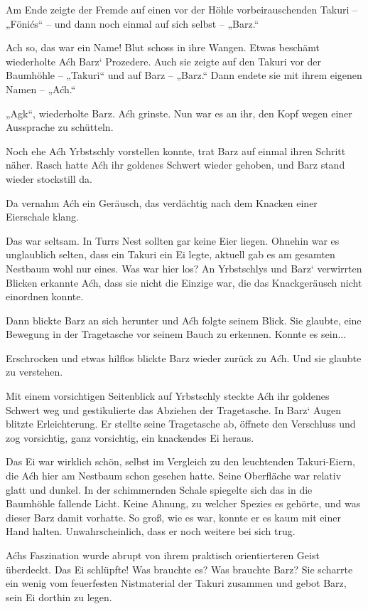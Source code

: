 Am Ende zeigte der Fremde auf einen vor der Höhle vorbeirauschenden Takuri – „Fönićs“ – und dann noch einmal auf sich selbst – „Barz.“

Ach so, das war ein Name! Blut schoss in ihre Wangen. Etwas beschämt wiederholte Aćh Barz‘ Prozedere. Auch sie zeigte auf den Takuri vor der Baumhöhle – „Takuri“ und auf Barz – „Barz.“ Dann endete sie mit ihrem eigenen Namen – „Aćh.“

„Agk“, wiederholte Barz. Aćh grinste. Nun war es an ihr, den Kopf wegen einer Aussprache zu schütteln.

Noch ehe Aćh Yrbstschly vorstellen konnte, trat Barz auf einmal ihren Schritt näher. Rasch hatte Aćh ihr goldenes Schwert wieder gehoben, und Barz stand wieder stockstill da.

Da vernahm Aćh ein Geräusch, das verdächtig nach dem Knacken einer Eierschale klang.

Das war seltsam. In Turrs Nest sollten gar keine Eier liegen. Ohnehin war es unglaublich selten, dass ein Takuri ein Ei legte, aktuell gab es am gesamten Nestbaum wohl nur eines. Was war hier los? An Yrbstschlys und Barz‘ verwirrten Blicken erkannte Aćh, dass sie nicht die Einzige war, die das Knackgeräusch nicht einordnen konnte.

Dann blickte Barz an sich herunter und Aćh folgte seinem Blick. Sie glaubte, eine Bewegung in der Tragetasche vor seinem Bauch zu erkennen. Konnte es sein...

Erschrocken und etwas hilflos blickte Barz wieder zurück zu Aćh. Und sie glaubte zu verstehen.

Mit einem vorsichtigen Seitenblick auf Yrbstschly steckte Aćh ihr goldenes Schwert weg und gestikulierte das Abziehen der Tragetasche. In Barz‘ Augen blitzte Erleichterung. Er stellte seine Tragetasche ab, öffnete den Verschluss und zog vorsichtig, ganz vorsichtig, ein knackendes Ei heraus.

Das Ei war wirklich schön, selbst im Vergleich zu den leuchtenden Takuri-Eiern, die Aćh hier am Nestbaum schon gesehen hatte. Seine Oberfläche war relativ glatt und dunkel. In der schimmernden Schale spiegelte sich das in die Baumhöhle fallende Licht. Keine Ahnung, zu welcher Spezies es gehörte, und was dieser Barz damit vorhatte. So groß, wie es war, konnte er es kaum mit einer Hand halten. Unwahrscheinlich, dass er noch weitere bei sich trug.

Aćhs Faszination wurde abrupt von ihrem praktisch orientierteren Geist überdeckt. Das Ei schlüpfte! Was brauchte es? Was brauchte Barz? Sie scharrte ein wenig vom feuerfesten Nistmaterial der Takuri zusammen und gebot Barz, sein Ei dorthin zu legen.

